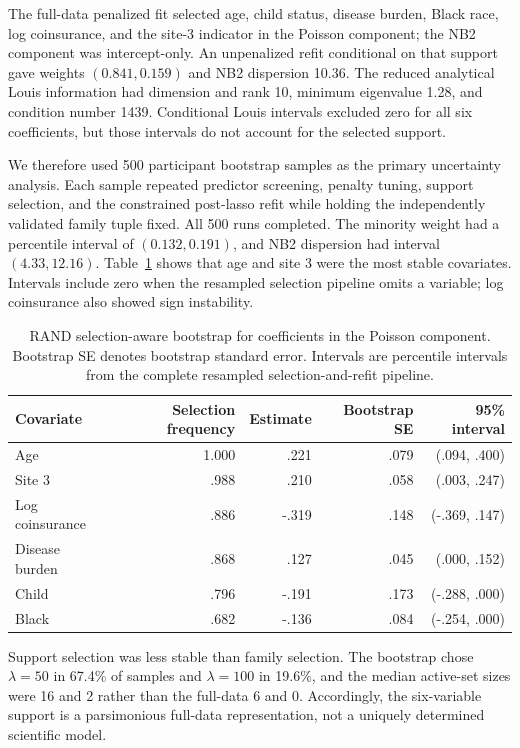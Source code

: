\documentclass[11pt]{article}
\begin{document}
The full-data penalized fit selected age, child status, disease burden, Black
race, log coinsurance, and the site-3 indicator in the Poisson component; the
NB2 component was intercept-only.  An unpenalized refit conditional on that
support gave weights \((0.841,0.159)\) and NB2 dispersion 10.36.  The reduced
analytical Louis information had dimension and rank 10, minimum eigenvalue
1.28, and condition number 1439.  Conditional Louis intervals excluded zero
for all six coefficients, but those intervals do not account for the selected
support.

We therefore used 500 participant bootstrap samples as the primary uncertainty
analysis.  Each sample repeated predictor screening, penalty tuning, support
selection, and the constrained post-lasso refit while holding the independently
validated family tuple fixed.  All 500 runs completed.  The minority weight had
a percentile interval of \((0.132,0.191)\), and NB2 dispersion had interval
\((4.33,12.16)\).  Table~\ref{tab:rand_bootstrap} shows that age and site 3
were the most stable covariates.  Intervals include zero when the resampled
selection pipeline omits a variable; log coinsurance also showed sign
instability.

\begin{table}[t]
\centering
\caption{RAND selection-aware bootstrap for coefficients in the Poisson
component.  Bootstrap SE denotes bootstrap standard error.  Intervals are
percentile intervals from the complete resampled selection-and-refit pipeline.}
\label{tab:rand_bootstrap}
\small
\begin{tabular}{lrrrr}
\toprule
Covariate & Selection frequency & Estimate & Bootstrap SE & 95\% interval \\
\midrule
Age & 1.000 & .221 & .079 & (.094, .400) \\
Site 3 & .988 & .210 & .058 & (.003, .247) \\
Log coinsurance & .886 & -.319 & .148 & (-.369, .147) \\
Disease burden & .868 & .127 & .045 & (.000, .152) \\
Child & .796 & -.191 & .173 & (-.288, .000) \\
Black & .682 & -.136 & .084 & (-.254, .000) \\
\bottomrule
\end{tabular}
\end{table}

Support selection was less stable than family selection.  The bootstrap chose
\(\lambda=50\) in 67.4\% of samples and \(\lambda=100\) in 19.6\%, and
the median active-set sizes were 16 and 2 rather than the full-data 6 and 0.
Accordingly, the six-variable support is a parsimonious full-data
representation, not a uniquely determined scientific model.
\end{document}
